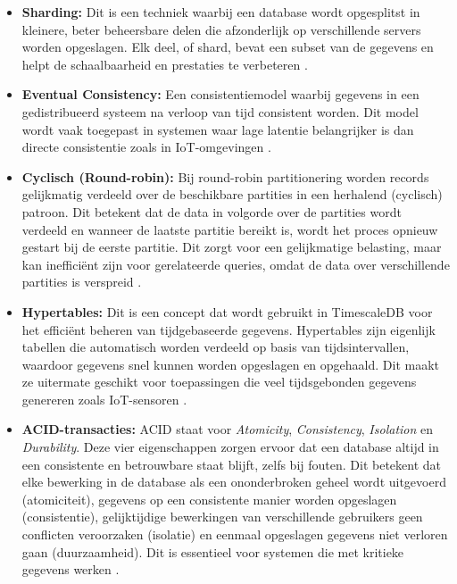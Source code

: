 \begin{itemize}
    \item \textbf{Sharding:} Dit is een techniek waarbij een database wordt opgesplitst in kleinere, beter beheersbare delen die afzonderlijk op verschillende servers worden opgeslagen. Elk deel, of shard, bevat een subset van de gegevens en helpt de schaalbaarheid en prestaties te verbeteren \autocite{Mahmud2020}.

    \item \textbf{Eventual Consistency:} Een consistentiemodel waarbij gegevens in een gedistribueerd systeem na verloop van tijd consistent worden. Dit model wordt vaak toegepast in systemen waar lage latentie belangrijker is dan directe consistentie zoals in IoT-omgevingen \autocite{Cao2020}.

    \item \textbf{Cyclisch (Round-robin):} Bij round-robin partitionering worden records gelijkmatig verdeeld over de beschikbare partities in een herhalend (cyclisch) patroon. Dit betekent dat de data in volgorde over de partities wordt verdeeld en wanneer de laatste partitie bereikt is, wordt het proces opnieuw gestart bij de eerste partitie. Dit zorgt voor een gelijkmatige belasting, maar kan inefficiënt zijn voor gerelateerde queries, omdat de data over verschillende partities is verspreid \autocite{Ponnusamy2024}.

    \item \textbf{Hypertables:} Dit is een concept dat wordt gebruikt in TimescaleDB voor het efficiënt beheren van tijdgebaseerde gegevens. Hypertables zijn eigenlijk tabellen die automatisch worden verdeeld op basis van tijdsintervallen, waardoor gegevens snel kunnen worden opgeslagen en opgehaald. Dit maakt ze uitermate geschikt voor toepassingen die veel tijdsgebonden gegevens genereren zoals IoT-sensoren \autocite{TimescaleDBDocumentation}.

    \item \textbf{ACID-transacties:} ACID staat voor \textit{Atomicity}, \textit{Consistency}, \textit{Isolation} en \textit{Durability}. Deze vier eigenschappen zorgen ervoor dat een database altijd in een consistente en betrouwbare staat blijft, zelfs bij fouten. Dit betekent dat elke bewerking in de database als een ononderbroken geheel wordt uitgevoerd (atomiciteit), gegevens op een consistente manier worden opgeslagen (consistentie), gelijktijdige bewerkingen van verschillende gebruikers geen conflicten veroorzaken (isolatie) en eenmaal opgeslagen gegevens niet verloren gaan (duurzaamheid). Dit is essentieel voor systemen die met kritieke gegevens werken \autocite{Cao2020}.


\end{itemize}
